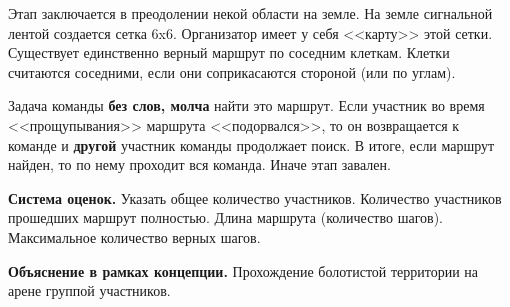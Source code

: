
\par Этап заключается в преодолении некой области на земле. На земле сигнальной лентой создается сетка 6x6. Организатор имеет у себя <<карту>> этой сетки. Существует единственно верный маршрут по соседним клеткам. Клетки считаются соседними, если они соприкасаются стороной (или по углам).

\par Задача команды \textbf{без слов, молча} найти это маршрут. Если участник во время <<прощупывания>> маршрута <<подорвался>>, то он возвращается к команде и \textbf{другой} участник команды продолжает поиск. В итоге, если маршрут найден, то по нему проходит вся команда. Иначе этап завален.

\par \textbf{Система оценок.} Указать общее количество участников. Количество участников прошедших маршрут полностью. Длина маршрута (количество шагов). Максимальное количество верных шагов.

\par \textbf{Объяснение в рамках концепции.} Прохождение болотистой территории на арене группой участников.